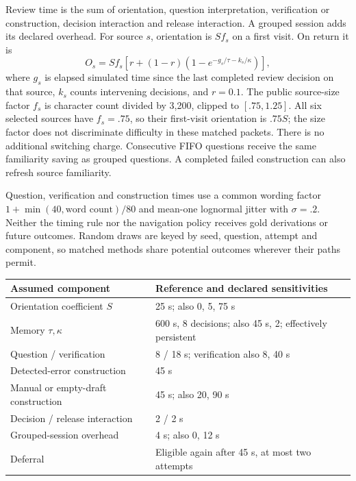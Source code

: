 \documentclass[10pt,a4paper]{article}
\begin{document}
Review time is the sum of orientation, question interpretation, verification or
construction, decision interaction and release interaction. A grouped session
adds its declared overhead. For source $s$, orientation is $S f_s$ on a first
visit. On return it is
\begin{equation}
 O_s=S f_s\left[r+(1-r)\left(1-e^{-g_s/\tau-k_s/\kappa}\right)\right],
\end{equation}
where $g_s$ is elapsed simulated time since the last completed review decision on
that source, $k_s$ counts intervening decisions, and $r=0.1$. The public source-size
factor $f_s$ is character count divided by 3,200, clipped to $[.75,1.25]$.
All six selected sources have $f_s=.75$, so their first-visit orientation is
$.75S$; the size factor does not discriminate difficulty in these matched packets.
There is no additional switching charge. Consecutive FIFO questions receive the
same familiarity saving as grouped questions. A completed failed construction
can also refresh source familiarity.

Question, verification and construction times use a common wording factor
$1+\min(40,\text{word count})/80$ and mean-one lognormal jitter with $\sigma=.2$.
Neither the timing rule nor the navigation policy receives gold derivations or
future outcomes. Random draws are keyed by seed, question, attempt and component,
so matched methods share potential outcomes wherever their paths permit.

\begin{center}\small
\begin{tabular}{p{.40\linewidth}p{.52\linewidth}}
\toprule
Assumed component & Reference and declared sensitivities\\\midrule
Orientation coefficient $S$ & 25 s; also 0, 5, 75 s\\
Memory $\tau,\kappa$ & 600 s, 8 decisions; also 45 s, 2; effectively persistent\\
Question / verification & 8 / 18 s; verification also 8, 40 s\\
Detected-error construction & 45 s\\
Manual or empty-draft construction & 45 s; also 20, 90 s\\
Decision / release interaction & 2 / 2 s\\
Grouped-session overhead & 4 s; also 0, 12 s\\
Deferral & Eligible again after 45 s, at most two attempts\\\bottomrule
\end{tabular}\end{center}
\end{document}
